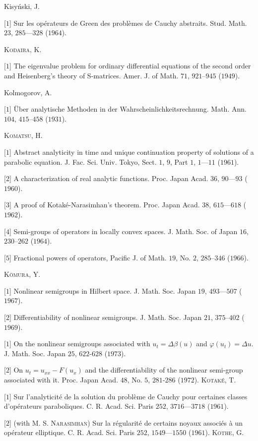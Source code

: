 Kisyński, J. 

[$1$] Sur les opérateurs de Green des problèmes de Cauchy abstraits. Stud. Math. $23$, $285$---$328$ ($1964$). 

\textsc{Kodaira}, K. 

[$1$] The eigenvalue problem for ordinary differential equations of the second order and Heisenberg's theory of S-matrices. Amer. J. of Math. $71$, $921$--$945$ ($1949$). 

Kolmogorov, A. 

[$1$] Über analytische Methoden in der Wahrscheinlichkeitsrechnung. Math. Ann. $104$, $415$--$458$ ($1931$). 

\textsc{Komatsu}, H. 

[$1$] Abstract analyticity in time and unique continuation property of solutions of a parabolic equation. J. Fac. Sci. Univ. Tokyo, Sect. $1$, $9$, Part $1$, $1$---$11$ ($1961$). 

[$2$] A characterization of real analytic functions. Proc. Japan Acad. $36$, $90$---$93$ ($1960$). 

[$3$] A proof of Kotaké-Narasimhan's theorem. Proc. Japan Acad. $38$, $615$---$618$ ($1962$). 

[$4$] Semi-groups of operators in locally convex spaces. J. Math. Soc. of Japan $16$, $230$--$262$ ($1964$). 

[$5$] Fractional powers of operators, Pacific J. of Math. $19$, No. $2$, $285$--$346$ ($1966$). 

\textsc{Kōmura}, Y. 

[$1$] Nonlinear semigroups in Hilbert space. J. Math. Soc. Japan $19$, $493$---$507$ ($1967$). 

[$2$] Differentiability of nonlinear semigroups. J. Math. Soc. Japan $21$, $375$--$402$ ($1969$). 


[$1$] On the nonlinear semigroups associated with $u_{t} = \Delta \beta(u)$ and $\varphi(u_{t}) = \Delta u$. J. Math. Soc. Japan $25$, $622$-$628$ ($1973$). 

[$2$] On $u_t = u_{xx} - F(u_x)$ and the differentiability of the nonlinear semi-group associated with it. Proc. Japan Acad. $48$, No. $5$, $281$-$286$ ($1972$). \textsc{Kotaké}, T. 

[$1$] Sur l'analyticité de la solution du problème de Cauchy pour certaines classes d'opérateurs paraboliques. C. R. Acad. Sci. Paris $252$, $3716$---$3718$ ($1961$). 

[$2$] (with M. S. \textsc{Narasimhan}) Sur la régularité de certains noyaux associés à un opérateur elliptique. C. R. Acad. Sci. Paris $252$, $1549$---$1550$ ($1961$). \textsc{Köthe}, G. 

